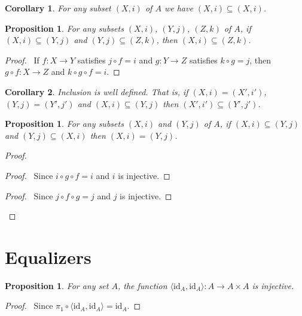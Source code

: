 \documentclass{book}
\let\qed\relax
\newtheorem{prop}[ax]{Proposition}
\newtheorem{cor}{Corollary}[ax]
\theoremstyle{definition}
\newcommand{\id}[1]{\ensuremath{\mathrm{id}_{#1}}}
\begin{document}
\begin{cor}
For any subset $(X,i)$ of $A$ we have $(X,i) \subseteq (X,i)$.
\end{cor}

\begin{prop}
For any subsets $(X,i)$, $(Y,j)$, $(Z,k)$ of $A$, if $(X,i) \subseteq (Y,j)$ and $(Y,j) \subseteq (Z,k)$, then $(X,i) \subseteq (Z,k)$.
\end{prop}

\begin{proof}
\pf\ If $f : X \rightarrow Y$ satisfies $j \circ f = i$ and $g : Y \rightarrow Z$ satisfies $k \circ g = j$, then $g \circ f : X \rightarrow Z$ and $k \circ g \circ f = i$. \qed
\end{proof}

\begin{cor}
Inclusion is well defined. That is, if $(X,i) = (X',i')$, $(Y,j) = (Y',j')$ and $(X,i) \subseteq (Y,j)$ then $(X',i') \subseteq (Y',j')$.
\end{cor}

\begin{prop}
For any subsets $(X,i)$ and $(Y,j)$ of $A$, if $(X,i) \subseteq (Y,j)$ and $(Y,j) \subseteq (X,i)$ then $(X,i) = (Y,j)$.
\end{prop}

\begin{proof}
\pf
{}
\step{3}{$g \circ f = \id{X}$}
\begin{proof}
	\pf\ Since $i \circ g \circ f = i$ and $i$ is injective.
\end{proof}
\step{4}{$f \circ g = \id{Y}$}
\begin{proof}
	\pf\ Since $j \circ f \circ g = j$ and $j$ is injective.
\end{proof}
\qed
\end{proof}

\section{Equalizers}

\begin{prop}
For any set $A$, the function $\langle \id{A}, \id{A} \rangle : A \rightarrow A \times A$ is injective.
\end{prop}

\begin{proof}
\pf\ Since $\pi_1 \circ \langle \id{A}, \id{A} \rangle = \id{A}$. \qed
\end{proof}
\end{document}
